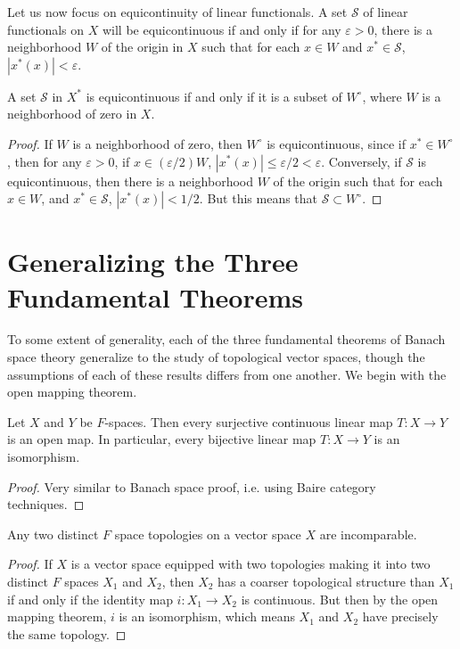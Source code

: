 Let us now focus on equicontinuity of linear functionals. A set $\mathcal{S}$ of linear functionals on $X$ will be equicontinuous if and only if for any $\varepsilon > 0$, there is a neighborhood $W$ of the origin in $X$ such that for each $x \in W$ and $x^* \in \mathcal{S}$, $|x^*(x)| < \varepsilon$.

\begin{theorem}
    A set $\mathcal{S}$ in $X^*$ is equicontinuous if and only if it is a subset of $W^\circ$, where $W$ is a neighborhood of zero in $X$.
\end{theorem}
\begin{proof}
    If $W$ is a neighborhood of zero, then $W^\circ$ is equicontinuous, since if $x^* \in W^\circ$, then for any $\varepsilon > 0$, if $x \in (\varepsilon/2) W$, $|x^*(x)| \leq \varepsilon/2 < \varepsilon$. Conversely, if $\mathcal{S}$ is equicontinuous, then there is a neighborhood $W$ of the origin such that for each $x \in W$, and $x^* \in \mathcal{S}$, $|x^*(x)| < 1/2$. But this means that $\mathcal{S} \subset W^\circ$.
\end{proof}

\section{Generalizing the Three Fundamental Theorems}

To some extent of generality, each of the three fundamental theorems of Banach space theory generalize to the study of topological vector spaces, though the assumptions of each of these results differs from one another. We begin with the open mapping theorem.

\begin{theorem}
    Let $X$ and $Y$ be $F$-spaces. Then every surjective continuous linear map $T: X \to Y$ is an open map. In particular, every bijective linear map $T: X \to Y$ is an isomorphism.
\end{theorem}
\begin{proof}
    Very similar to Banach space proof, i.e. using Baire category techniques.
\end{proof}

\begin{corollary}
    Any two distinct $F$ space topologies on a vector space $X$ are incomparable.
\end{corollary}
\begin{proof}
    If $X$ is a vector space equipped with two topologies making it into two distinct $F$ spaces $X_1$ and $X_2$, then $X_2$ has a coarser topological structure than $X_1$ if and only if the identity map $i: X_1 \to X_2$ is continuous. But then by the open mapping theorem, $i$ is an isomorphism, which means $X_1$ and $X_2$ have precisely the same topology.
\end{proof}


